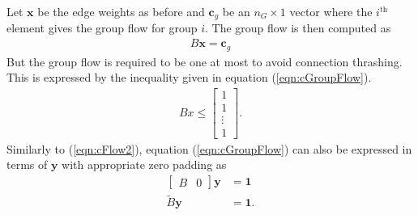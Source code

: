 Let $\mathbf{x}$ be the edge weights as before and $\mathbf{c}_g$ be an $n_G \times 1$ vector where the $i^{\text{th}}$ element gives the group flow for group $i$. The group flow is then computed as 
\begin{align}\label{eqn:cGroupFlow}
	B\mathbf{x} = \mathbf{c}_g
\end{align}
But the group flow is required to be one at most to avoid connection thrashing.  This is expressed by the inequality given in equation (\ref{eqn:cGroupFlow}).
\begin{align}\label{eqn:cGroupFlow}
	Bx \le \begin{bmatrix} 1\\ 1 \\\vdots \\ 1\end{bmatrix}.
\end{align}
Similarly to (\ref{eqn:cFlow2}), equation (\ref{eqn:cGroupFlow}) can also be expressed in terms of $\mathbf{y}$ with appropriate zero padding as
\begin{equation}\label{eqn:cGroupFlow2}
	\begin{aligned}
		\begin{bmatrix} B & 0\end{bmatrix} \mathbf{y} &= \mathbf{1} \\
		\tilde{B}\mathbf{y} &= \mathbf{1}.
	\end{aligned}
\end{equation}
